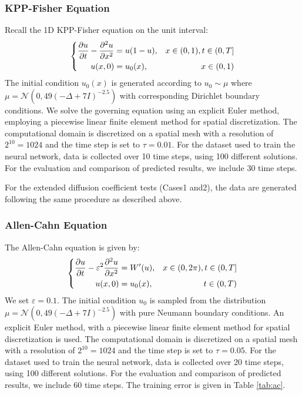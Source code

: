 \documentclass[preprint,12pt]{elsarticle}
\theoremstyle{plain}
\numberwithin{figure}{section}
\numberwithin{table}{section}
\newcommand{\jdall}[1]{{\color{black}#1}}
\begin{document}
\subsubsection{KPP-Fisher Equation}
Recall the 1D KPP-Fisher equation on the unit interval:
\begin{equation}
	\left\{	\begin{aligned}
		{\partial u\over \partial t}-{\partial^2 u\over \partial x^2}  &= u(1 -u),  &x\in (0,1),t\in (0,T]\\
		u(x,0) &= u_0(x), &x\in (0,1)
	\end{aligned}\right.
\end{equation}
The initial condition $u_0(x)$  is generated according to $u_0\sim\mu $ where $\mu=\mathcal{N}(0,49(-\Delta+7I)^{-2.5})$ with corresponding Dirichlet boundary conditions. We solve the governing equation using an explicit Euler method, employing a piecewise linear finite element method for spatial discretization. The computational domain is discretized on a spatial mesh with a resolution of $2^{10}=1024$ and  the time step is set to $\tau=0.01$. For the dataset used to train the neural network, data is collected over 10 time steps, using 100 different solutions. 
For the evaluation and comparison of predicted results, we include 30 time steps.

\jdall{
For the extended diffusion coefficient tests (Cases1 and2), the data are generated following the same procedure as described above.
}


\subsubsection{Allen-Cahn Equation}
The Allen-Cahn equation is given by:
\begin{equation}
	\left\{	\begin{aligned}
		{\partial u\over \partial t} - \varepsilon^2 {\partial^2 u\over\partial x^2} &= W'(u),  &x\in (0,2\pi),t\in (0,T]\\
		u(x,0) &= u_0(x),&t\in (0,T)\\
	\end{aligned}\right.
\end{equation}
We set $\varepsilon=0.1$. The initial condition  $u_0 $ is sampled from the distribution $\mu=\mathcal{N}(0,49(-\Delta+7I)^{-2.5})$ with pure Neumann boundary conditions. An explicit Euler method, with a piecewise linear finite element method for spatial discretization is used. The computational domain is discretized on a spatial mesh with a resolution of $2^{10}=1024$ and  the time step is set to $\tau=0.05$. For the dataset used to train the neural network, data is collected over 20 time steps, using 100 different solutions. For the evaluation and comparison of predicted results, we include 60 time steps. The training error is given in Table \ref{tab:ac}.
\end{document}
